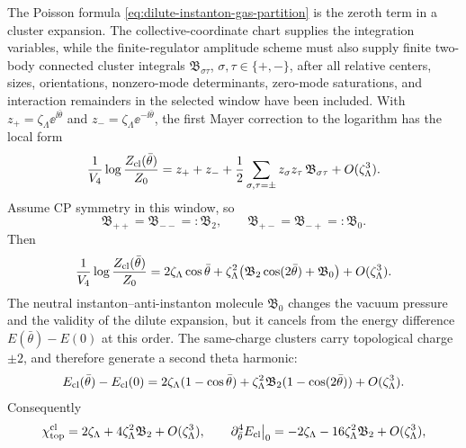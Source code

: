 \begin{controlledapproximation}
\label{ca:first-cluster-correction-dilute-instantons}
The Poisson formula
\eqref{eq:dilute-instanton-gas-partition} is the zeroth term in a cluster
expansion.  The collective-coordinate chart supplies the integration
variables, while the finite-regulator amplitude scheme must also supply
finite two-body connected cluster integrals \(\mathfrak B_{\sigma\tau}\),
\(\sigma,\tau\in\{+,-\}\), after all relative centers, sizes, orientations,
nonzero-mode determinants, zero-mode saturations, and interaction remainders
in the selected window have been included.  With
\(z_+=\zeta_\Lambda\ee^{\ii\bar\theta}\) and
\(z_-=\zeta_\Lambda\ee^{-\ii\bar\theta}\), the first Mayer correction to the
logarithm has the local form
\begin{equation}
  \frac1{V_4}\log\frac{Z_{\rm cl}(\bar\theta)}{Z_0}
  =
  z_+ + z_-
  +
  \frac12
  \sum_{\sigma,\tau=\pm}
    z_\sigma z_\tau\,\mathfrak B_{\sigma\tau}
  +O(\zeta_\Lambda^3).
  \label{eq:instanton-first-mayer-pressure}
\end{equation}
Assume CP symmetry in this window, so
\[
  \mathfrak B_{++}=\mathfrak B_{--}=:\mathfrak B_2,
  \qquad
  \mathfrak B_{+-}=\mathfrak B_{-+}=:\mathfrak B_0 .
\]
Then
\begin{equation}
  \frac1{V_4}\log\frac{Z_{\rm cl}(\bar\theta)}{Z_0}
  =
  2\zeta_\Lambda\cos\bar\theta
  +
  \zeta_\Lambda^2
  \bigl(\mathfrak B_2\cos(2\bar\theta)+\mathfrak B_0\bigr)
  +O(\zeta_\Lambda^3).
  \label{eq:instanton-first-mayer-theta-pressure}
\end{equation}
The neutral instanton--anti-instanton molecule \(\mathfrak B_0\) changes the
vacuum pressure and the validity of the dilute expansion, but it cancels from
the energy difference \(E(\bar\theta)-E(0)\) at this order.  The same-charge
clusters carry topological charge \(\pm2\), and therefore generate a second
theta harmonic:
\begin{equation}
  E_{\rm cl}(\bar\theta)-E_{\rm cl}(0)
  =
  2\zeta_\Lambda(1-\cos\bar\theta)
  +
  \zeta_\Lambda^2\mathfrak B_2(1-\cos(2\bar\theta))
  +O(\zeta_\Lambda^3).
  \label{eq:instanton-first-cluster-energy}
\end{equation}
Consequently
\begin{equation}
  \chi_{\rm top}^{\rm cl}
  =
  2\zeta_\Lambda+4\zeta_\Lambda^2\mathfrak B_2+O(\zeta_\Lambda^3),
  \qquad
  \partial_{\bar\theta}^4E_{\rm cl}\big|_{0}
  =
  -2\zeta_\Lambda-16\zeta_\Lambda^2\mathfrak B_2+O(\zeta_\Lambda^3),

\end{equation}
\end{controlledapproximation}

